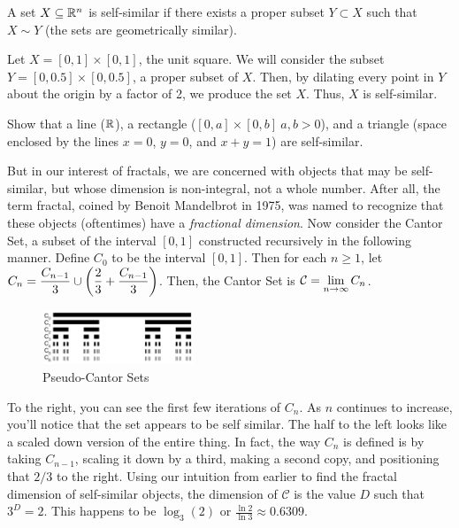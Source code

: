 \clearpage

\begin{definition}
    A set $X\subseteq \mathbb{R}^n$ is self-similar if there exists a proper subset $Y\subset X$ such that $X \sim Y$ (the sets are geometrically similar).
\end{definition}

\begin{example}
    Let $X=[0,1]\times[0,1]$, the unit square. We will consider the subset $Y=[0,0.5]\times[0,0.5]$, a proper subset of $X$. Then, by dilating every point in $Y$ about the origin by a factor of 2, we produce the set $X$. Thus, $X$ is self-similar.
\end{example}

\begin{exercise}
    Show that a line ($\mathbb{R}$), a rectangle ($[0,a]\times[0,b] \ a,b>0$), and a triangle (space enclosed by the lines $x=0$, $y=0$, and $x+y=1$)  are self-similar.
\end{exercise}

But in our interest of fractals, we are concerned with objects that may be self-similar, but whose dimension is non-integral, not a whole number. After all, the term fractal, coined by Benoit Mandelbrot in 1975, was named to recognize that these objects (oftentimes) have a \emph{fractional dimension}. Now consider the Cantor Set, a subset of the interval $[0,1]$ constructed recursively in the following manner. Define $C_0$ to be the interval $[0,1]$. Then for each $n\geq 1$, let $\displaystyle C_n = \frac{C_{n-1}}{3}\cup \left(\frac{2}{3} + \frac{C_{n-1}}{3}\right)$. Then, the Cantor Set is $\displaystyle \mathcal{C}=\lim_{n\to\infty} C_n$. \\

\begin{figure}
  \begin{center}
    \includegraphics[width=0.4\textwidth]{Images/1.4.3.png}
  \end{center}
  \caption{Pseudo-Cantor Sets}
\end{figure}

To the right, you can see the first few iterations of $C_n$. As $n$ continues to increase, you'll notice that the set appears to be self similar. The half to the left looks like a scaled down version of the entire thing. In fact, the way $C_n$ is defined is by taking $C_{n-1}$, scaling it down by a third, making a second copy, and positioning that $2/3$ to the right. Using our intuition from earlier to find the fractal dimension of self-similar objects, the dimension of $\mathcal{C}$ is the value $D$ such that $3^D = 2$. This happens to be $\log_3(2)$ or $ \frac{\ln 2}{\ln 3} \approx 0.6309$. \\

